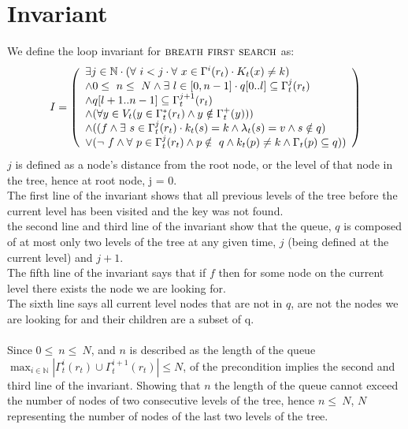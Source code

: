 \documentclass[headings=small,a4paper,12pt]{scrartcl}
\newcommand{\bfs}{\textsc{breath first search}\xspace}
\begin{document}
\section{Invariant}
\label{sec:invariant}
\text We define the loop invariant for $\bfs$ as:\\
\begin{align*}
    &I = \left(
    \begin{array}{l}
         \exists j\in \mathbb{N}\cdot{}(\forall~i<j\cdot{}\forall~x \in \Gamma^{i}(r_t)\cdot{}K_t(x) \ne k)\\
         \wedge 0\leq~n\leq~N\wedge \exists~l\in[0,n-1] \cdot{}q[0..l] \subseteq \Gamma^j_t(r_t)\\
         \wedge q[l+1..n-1] \subseteq \Gamma^{j+1}_t(r_t)\\
         \wedge (\forall y\in V_t(y\in \Gamma^{*}_{t}(r_t)\wedge y \notin\Gamma^{+}_{t}(y)))\\
         \wedge ((f\wedge\exists~s\in \Gamma^{j}_{t}(r_t)\cdot{}k_t(s) = k\wedge \lambda_t(s) = v\wedge s\notin q)\\
         \vee (\neg~f \wedge \forall~p \in \Gamma^j_t(r_t) \wedge p\notin~q \wedge k_t(p) \ne k \wedge \Gamma_t(p) \subseteq q))
    \end{array}
    \right)\\
\end{align*}
$j$ is defined as a node's distance from the root node, or the level of that node in the tree, hence at root node, j = 0.\\
%
The first line of the invariant shows that all previous levels of the tree before the current level has been visited and the key was not found.\\
the second line and third line of the invariant show that the queue, $q$ is composed of at most only two levels of the tree at any given time, $j$ (being defined at the current level) and $j+1$.\\
The fifth line of the invariant says that if $f$ then for some node on the current level there exists the node we are looking for.\\
The sixth line says all current level nodes that are not in $q$, are not the nodes we are looking for and their children are a subset of q.\\
\\
Since $0\leq~n\leq~N$, and $n$ is described as the length of the queue\\ $\max_{i\in\mathbb{N}}|\Gamma_t^{i}(r_t)\cup\Gamma_{t}^{i+1}(r_t)|\leq N$, of the precondition implies the second and third line of the invariant. Showing that $n$ the length of the queue cannot exceed the number of nodes of two consecutive levels of the tree, hence $n\leq~N$, $N$ representing the number of nodes of the last two levels of the tree.\\
\end{document}
